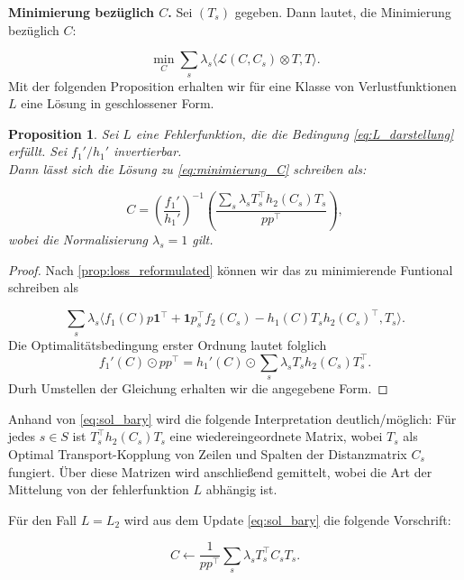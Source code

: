 \documentclass[11pt,a4paper]{article}
\newtheorem{proposition}[theorem]{Proposition}
\numberwithin{equation}{section}
\begin{document}
	\noindent \textbf{Minimierung bezüglich $C$.} Sei $(T_s)$ gegeben. Dann lautet, die Minimierung bezüglich $C$:
	
	\begin{equation}
	\min_C \sum_s{\lambda_s \langle \mathcal{L}(C,C_s) \otimes T,T \rangle}. \label{eq:minimierung_C}
	\end{equation}
	Mit der folgenden Proposition erhalten wir für eine Klasse von Verlustfunktionen $L$ eine Lösung in geschlossener Form.
	
	
	\begin{proposition}
		Sei $L$ eine Fehlerfunktion, die die Bedingung \autoref{eq:L_darstellung} erfüllt. Sei $f_1'/h_1'$ invertierbar. \\
		Dann lässt sich die Lösung zu \autoref{eq:minimierung_C} schreiben als:
		
		\begin{equation}
		C = \left(\frac{f_1'}{h_1'}\right)^{-1} \left(\frac{\sum_s{\lambda_s T_s^\top h_2(C_s)T_s}}{pp^\top}\right),
		\label{eq:sol_bary}
		\end{equation}
		wobei die Normalisierung $\lambda_s = 1$ gilt.
	\end{proposition}
	\begin{proof}
		Nach \autoref{prop:loss_reformulated} können wir das zu minimierende Funtional schreiben als
		
		\begin{equation}
		\sum_s{\lambda_s \langle f_1(C)p\boldsymbol{1}^\top + \boldsymbol{1}p_s^\top f_2(C_s) - h_1(C)T_s h_2(C_s)^\top , T_s \rangle}.
		\end{equation}
		Die Optimalitätsbedingung erster Ordnung lautet folglich 
		\begin{equation}
		f_1'(C) \odot pp^\top = h_1'(C) \odot \sum_s{\lambda_s T_sh_2(C_s)T_s^\top}.
		\end{equation}
		Durh Umstellen der Gleichung erhalten wir die angegebene Form.
	\end{proof}
	Anhand von \autoref{eq:sol_bary} wird die folgende Interpretation deutlich/möglich: Für jedes $s \in S$ ist $T_s^\top h_2(C_s)T_s$ eine wiedereingeordnete Matrix, wobei $T_s$ als Optimal Transport-Kopplung von Zeilen und Spalten der Distanzmatrix $C_s$ fungiert. Über diese Matrizen wird anschließend gemittelt, wobei die Art der Mittelung von der fehlerfunktion $L$ abhängig ist.
	
	Für den Fall $L=L_2$ wird aus dem Update \autoref{eq:sol_bary} die folgende Vorschrift:
	
	\begin{equation}
	C \leftarrow \frac{1}{pp^\top}\sum_s{\lambda_s T_s^\top C_s T_s}. \label{eq:update_forL=L2}
	\end{equation}
	
\end{document}
